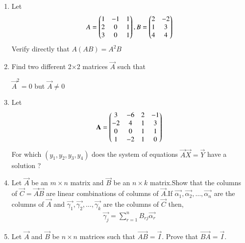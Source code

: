 \renewcommand{\theequation}{\theenumi}
\renewcommand{\thefigure}{\theenumi}
\begin{enumerate}[label=\thesubsection.\arabic*.,ref=\thesubsection.\theenumi]
%
\item Let
\begin{align}
   A=\begin{pmatrix}1&-1&1\\2&0&1\\3&0&1\end{pmatrix}, B=\begin{pmatrix}2&-2\\1&3\\4&4\end{pmatrix}
\end{align}
Verify directly that $ A(AB)=A^2B $

\solution

%
\item Find two different 2$\times$2 matrices $\vec{A}$ such that 

$\vec{A}^{2}=0$ but $\vec{A}\ne0$
%
\\
\solution

%
\item Let
\begin{align}
    \mathbf{A}=\begin{pmatrix}3 & -6 & 2 & -1\\-2 & 4 & 1 & 3\\0 & 0 & 1& 1\\1 & -2 & 1 & 0\end{pmatrix} 
\end{align}
For which $(y_1,y_2,y_3,y_4)$ does the system of equations $\vec{A}\vec{X}=\vec{Y}$ have a solution ? 
%
\solution

%
\item Let $\vec{A}$ be an $m \times n$ matrix and $\vec{B}$ be an $n \times k$ matrix.Show that the columns of $\vec{C}=\vec{A}\vec{B}$ are linear combinations of columns of $\vec{A}$.If $\vec{\alpha_1},\vec{\alpha_2},\hdots,\vec{\alpha_n}$ are the columns of $\vec{A}$ and $\vec{\gamma_1},\vec{\gamma_2},\hdots,\vec{\gamma_k}$ are the columns of $\vec{C}$ then,
\begin{align}
    \vec{\gamma_j}= \sum_{r=1}^{n}B_{rj}\vec{\alpha_r} 
\end{align}
%
\solution

\item Let $\vec{A}$ and $\vec{B}$ be $n \times n$ matrices such that $\vec{AB}=\vec{I}$. Prove that $\vec{BA}=\vec{I}$.
%
\solution

\end{enumerate}


